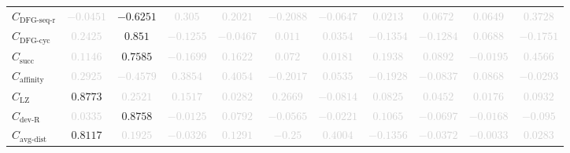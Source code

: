 \documentclass{standalone}
\newcommand{\dfgseqrationame}{\text{DFG-seq-r}}
\newcommand{\dfgseqratio}{C_{\dfgseqrationame}}
\newcommand{\dfgcycname}{\text{DFG-cyc}}
\newcommand{\dfgcyc}{C_{\dfgcycname}}
\newcommand{\numberofneighborhoodsname}{\text{succ}}
\newcommand{\numberofneighborhoods}{C_{\numberofneighborhoodsname}}
\newcommand{\lempelzivname}{\text{LZ}}
\newcommand{\lempelziv}{C_{\lempelzivname}}
\newcommand{\affinityname}{\text{affinity}}
\newcommand{\affinity}{C_{\affinityname}}
\newcommand{\deviationfromrandomname}{\text{dev-R}}
\newcommand{\deviationfromrandom}{C_{\deviationfromrandomname}}
\newcommand{\avgdistname}{\text{avg-dist}}
\newcommand{\avgdist}{C_{\avgdistname}}
\begin{document}
\begin{tabular}{lcccccccccc}
$\dfgseqratio$ & \textcolor{lightgray}{$-0.0451$} & $-0.6251$ & \textcolor{lightgray}{$0.305$} & \textcolor{lightgray}{$0.2021$} & \textcolor{lightgray}{$-0.2088$} & \textcolor{lightgray}{$-0.0647$} & \textcolor{lightgray}{$0.0213$} & \textcolor{lightgray}{$0.0672$} & \textcolor{lightgray}{$0.0649$} & \textcolor{lightgray}{$0.3728$} \\ 
$\dfgcyc$ & \textcolor{lightgray}{$0.2425$} & $0.851$ & \textcolor{lightgray}{$-0.1255$} & \textcolor{lightgray}{$-0.0467$} & \textcolor{lightgray}{$0.011$} & \textcolor{lightgray}{$0.0354$} & \textcolor{lightgray}{$-0.1354$} & \textcolor{lightgray}{$-0.1284$} & \textcolor{lightgray}{$0.0688$} & \textcolor{lightgray}{$-0.1751$} \\ 
$\numberofneighborhoods$ & \textcolor{lightgray}{$0.1146$} & $0.7585$ & \textcolor{lightgray}{$-0.1699$} & \textcolor{lightgray}{$0.1622$} & \textcolor{lightgray}{$0.072$} & \textcolor{lightgray}{$0.0181$} & \textcolor{lightgray}{$0.1938$} & \textcolor{lightgray}{$0.0892$} & \textcolor{lightgray}{$-0.0195$} & \textcolor{lightgray}{$0.4566$} \\ 
$\affinity$ & \textcolor{lightgray}{$0.2925$} & \textcolor{lightgray}{$-0.4579$} & \textcolor{lightgray}{$0.3854$} & \textcolor{lightgray}{$0.4054$} & \textcolor{lightgray}{$-0.2017$} & \textcolor{lightgray}{$0.0535$} & \textcolor{lightgray}{$-0.1928$} & \textcolor{lightgray}{$-0.0837$} & \textcolor{lightgray}{$0.0868$} & \textcolor{lightgray}{$-0.0293$} \\ 
$\lempelziv$ & $0.8773$ & \textcolor{lightgray}{$0.2521$} & \textcolor{lightgray}{$0.1517$} & \textcolor{lightgray}{$0.0282$} & \textcolor{lightgray}{$0.2669$} & \textcolor{lightgray}{$-0.0814$} & \textcolor{lightgray}{$0.0825$} & \textcolor{lightgray}{$0.0452$} & \textcolor{lightgray}{$0.0176$} & \textcolor{lightgray}{$0.0932$} \\ 
$\deviationfromrandom$ & \textcolor{lightgray}{$0.0335$} & $0.8758$ & \textcolor{lightgray}{$-0.0125$} & \textcolor{lightgray}{$0.0792$} & \textcolor{lightgray}{$-0.0565$} & \textcolor{lightgray}{$-0.0221$} & \textcolor{lightgray}{$0.1065$} & \textcolor{lightgray}{$-0.0697$} & \textcolor{lightgray}{$-0.0168$} & \textcolor{lightgray}{$-0.095$} \\ 
$\avgdist$ & $0.8117$ & \textcolor{lightgray}{$0.1925$} & \textcolor{lightgray}{$-0.0326$} & \textcolor{lightgray}{$0.1291$} & \textcolor{lightgray}{$-0.25$} & \textcolor{lightgray}{$0.4004$} & \textcolor{lightgray}{$-0.1356$} & \textcolor{lightgray}{$-0.0372$} & \textcolor{lightgray}{$-0.0033$} & \textcolor{lightgray}{$0.0283$} \\ 

\end{tabular}
\end{document}
